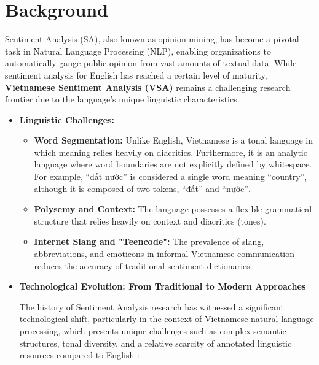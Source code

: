 \documentclass[12pt]{report} %
\begin{document}
\section{Background}

Sentiment Analysis (SA), also known as opinion mining, has become a pivotal task in Natural Language Processing (NLP), enabling organizations to automatically gauge public opinion from vast amounts of textual data. While sentiment analysis for English has reached a certain level of maturity, \textbf{Vietnamese Sentiment Analysis (VSA)} remains a challenging research frontier due to the language's unique linguistic characteristics.

\begin{itemize}
    \item \textbf{Linguistic Challenges:}
        \begin{itemize}
            \item \textbf{Word Segmentation:} Unlike English, Vietnamese is a tonal language in which meaning relies heavily on diacritics. Furthermore, it is an analytic language where word boundaries are not explicitly defined by whitespace. For example, \foreignlanguage{vietnamese}{``đất nước''} is considered
            a single word meaning ``country'', although it is composed of two tokens, \foreignlanguage{vietnamese}{``đất''} and \foreignlanguage{vietnamese}{``nước''}.

            \item \textbf{Polysemy and Context:} The language possesses a flexible grammatical structure that relies heavily on context and diacritics (tones).

            \item \textbf{Internet Slang and "Teencode":} The prevalence of slang, abbreviations, and emoticons in informal Vietnamese communication reduces the accuracy of traditional sentiment dictionaries.
        \end{itemize}

    \item \textbf{Technological Evolution: From Traditional to Modern Approaches}

    The history of Sentiment Analysis research has witnessed a significant technological shift, particularly in the context of Vietnamese natural language processing, which presents unique challenges such as complex semantic structures, tonal diversity, and a relative scarcity of annotated linguistic resources compared to English \cite{nguyen2018vlsp, pham2020sentiment}:


\end{itemize}
\end{document}
